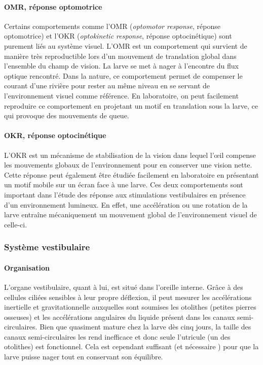\cite{portugues_neural_2009}

\paragraph{OMR, réponse optomotrice}
Certains comportements comme l'OMR (\emph{optomotor response}, réponse optomotrice) et l'OKR (\emph{optokinetic response}, réponse optocinétique) sont purement liés au système visuel. L'OMR est un comportement qui survient de manière très reproductible lors d'un mouvement de translation global dans l'ensemble du champ de vision. La larve se met à nager à l'encontre du flux optique rencontré. Dans la nature, ce comportement permet de compenser le courant d'une rivière pour rester au même niveau en se servant de l'environnement visuel comme référence. En laboratoire, on peut facilement reproduire ce comportement en projetant un motif en translation sous la larve, ce qui provoque des mouvements de queue.

\paragraph{OKR, réponse optocinétique}
L'OKR est un mécanisme de stabilisation de la vision dans lequel l’œil compense les mouvements globaux de l'environnement pour en conserver une vision nette. Cette réponse peut également être étudiée facilement en laboratoire en présentant un motif mobile sur un écran face à une larve. Ces deux comportements sont important dans l'étude des réponse aux stimulations vestibulaires en présence d'un environnement lumineux. En effet, une accélération ou une rotation de la larve entraîne mécaniquement un mouvement global de l'environnement visuel de celle-ci.

\subsubsection{Système vestibulaire}

\paragraph{Organisation}
L'organe vestibulaire, quant à lui, est situé dans l'oreille interne. Grâce à des cellules ciliées sensibles à leur propre déflexion, il peut mesurer les accélérations inertielle et gravitationnelle auxquelles sont soumises les otolithes (petites pierres osseuses) et les accélérations angulaires du liquide présent dans les canaux semi-circulaires. Bien que quasiment mature chez la larve dès cinq jours, la taille des canaux semi-circulaires les rend inefficace et donc seule l'utricule (un des otolithes) est fonctionnel. Cela est cependant suffisant (et nécessaire \cite{riley_development_2000}) pour que la larve puisse nager tout en conservant son équilibre.

